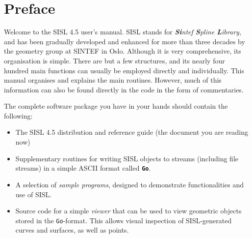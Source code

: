 \chapter{Preface}
Welcome to the SISL 4.5 user's manual.  SISL stands for
\emph{\textbf{Si}ntef \textbf{S}pline \textbf{L}ibrary}, and has been gradually 
developed and enhanced for more than three decades by the geometry group at SINTEF in Oslo.
Although it is very comprehensive, its organisation is simple.  There are but a 
few structures, and its nearly four hundred main functions can usually be employed
directly and individually. This manual organises and explains the main routines.  However, much of this
information can also be found directly in the code in the form of commentaries.

The complete software package you have in your hands should contain the following:
\begin{itemize}
\item The SISL 4.5 distribution and reference guide (the document you are reading now)
\item Supplementary routines for writing SISL objects to streams (including file 
streams) in a simple ASCII format called \textbf{\Verb/Go/}.
\item A selection of \emph{sample programs}, designed to demonstrate functionalities
and use of SISL.
\item Source code for a simple \emph{viewer} that can be used to view geometric objects stored
in the \Verb/Go/-format.  This allows visual inspection of SISL-generated curves
and surfaces, as well as points.
\end{itemize}

